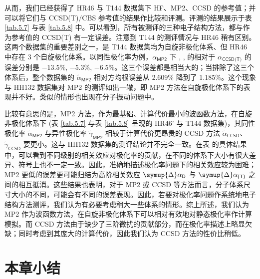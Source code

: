 从而，我们已经获得了 HR46 与 T144 数据集下 HF、MP2、CCSD 的参考值；并可以将它们与 CCSD(T)/CBS 参考值的结果作比较和评测。评测的结果展示于表 \ref{tab.5.7} 与表 \ref{tab.5.8} 中。可以看到，所有被测评的三种电子结构方法，都与作为参考值的 CCSD(T) 有一定误差。注意到 T144 的测评情况与 HR46 稍有区别。这两个数据集的重要差别之一，是 T144 数据集均为自旋非极化体系、但 HR46 中存在 3 个自旋极化体系。以同性极化率为例，$\alpha_\textsf{MP2}$ 下 , ,  的相对于 $\alpha_\textsf{CCSD(T)}$ 的误差分别是 $-13.5\%$, $-5.3\%$, $-6.5\%$。这三个误差都是相当大的；当排除了这三个体系后，整个数据集的 $\tilde \alpha_\textsf{MP2}$ 相对方均根误差从 2.609\% 降到了 1.185\%。这个现象与 HH132 数据集对 MP2 的测评如出一辙，即 MP2 方法在自旋极化体系下的表现并不好。类似的情形也出现在分子振动问题中\cite{Gu-Xu.JCTC.2021a}。

比较有意思的是，MP2 方法，作为最基础、计算代价最小的波函数方法，在自旋非极化体系下 (表 \ref{tab.5.7} 与表 \ref{tab.5.8} 呈现的 HR46' 与 T144 数据集)，其同性极化率 $\tilde \alpha_\textsf{MP2}$ 与异性极化率 $\tilde \gamma_\textsf{MP2}$ 相较于计算代价更昂贵的 CCSD 方法 $\tilde \alpha_\textsf{CCSD}$、$\tilde \gamma_\textsf{CCSD}$ 要更小。这与 HH132 数据集的测评结论并不完全一致\cite{Hait-Head-Gordon.PCCP.2018}。在表  的具体结果中，可以看到不同级别的相关效应对极化率的贡献，在不同的体系下大小有很大差异、符号上也不一定一致。因此，准确地描述极化率问题下的相关效应较为困难；MP2 更低的误差更可能归结为高阶相关效应 $\symup{\Delta} \alpha_\textsf{D}$ 与 $\symup{\Delta} \alpha_\textsf{(T)}$ 之间的相互抵消。这些结果也表明，对于 MP2 或 CCSD 等方法而言，分子体系尺寸大小的不同，可能会有不同的误差表现。因此，若要对极化率问题作系统地电子结构方法测评，我们认为有必要考虑稍大一些体系的情形。综上所述，我们认为 MP2 作为波函数方法，在自旋非极化体系下可以相对有效地对静态极化率作计算模拟。而 CCSD 方法由于缺少了三阶微扰的贡献部分，而在极化率描述上略显欠缺；同时考虑到其庞大的计算代价，因此我们认为 CCSD 方法的性价比稍低。

\section{本章小结}

